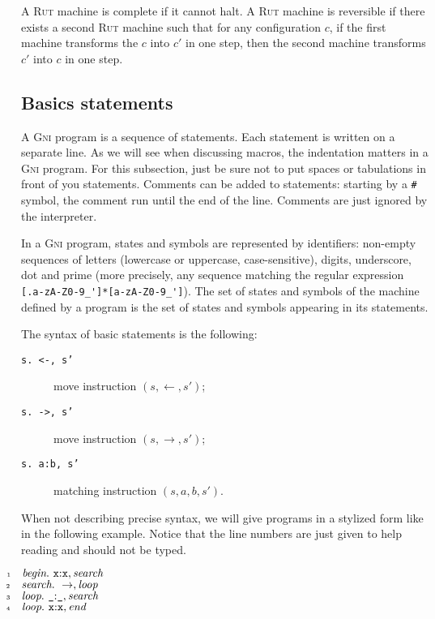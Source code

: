 \documentclass[a4paper,11pt]{article}
\theoremstyle{remark}
\begin{document}
\smallskip A \textsc{Rut} machine is complete if it cannot halt.
A \textsc{Rut} machine is reversible if there exists a second \textsc{Rut} machine such
that for any configuration $c$, if the first machine transforms the $c$ into $c'$ in one step,
then the second machine transforms $c'$ into $c$ in one step.

\subsection{Basics statements}

A \textsc{Gni} program is a sequence of statements. Each statement is written on a separate
line. As we will see when discussing macros,
the indentation matters in a \textsc{Gni} program. For this subsection, just be sure not to 
put spaces or tabulations in front of you statements. Comments can be added to statements:
starting by a \verb+#+ symbol, the comment run until the end of the line. Comments are
just ignored by the interpreter.

\smallskip In a \textsc{Gni} program, states and symbols are represented by identifiers:
non-empty sequences of letters (lowercase or uppercase, case-sensitive), digits, 
underscore, dot and prime
(more precisely, any sequence matching the regular expression \verb+[.a-zA-Z0-9_']*[a-zA-Z0-9_']+).
The set of states and symbols of the machine defined by a program is the set of states
and symbols appearing in its statements.

\medskip
\noindent The syntax of basic statements is the following:
\begin{description}
	\item[\texttt{s.~<-, s'}] move instruction $(s,\leftarrow,s')$;
	\item[\texttt{s.~->, s'}] move instruction $(s,\rightarrow,s')$;
	\item[\texttt{s.~a:b, s'}] matching instruction $(s,a,b,s')$.
\end{description}

When not describing precise syntax, we will give programs in a stylized form like in the following 
example. Notice that the line numbers are just given to help reading and should not be typed.

\begin{center}
\begin{minipage}{0.8\linewidth}
	$\null\llap{\tiny 1\kern 1.5em}\mbox{\em begin}.~\mbox{\tt x}\mbox{:}\mbox{\tt x}, \mbox{\em search}$\\
	$\null\llap{\tiny 2\kern 1.5em}\mbox{\em search}.~\rightarrow, \mbox{\em loop}$\\
	$\null\llap{\tiny 3\kern 1.5em}\mbox{\em loop}.~\mbox{\tt \_}\mbox{:}\mbox{\tt \_}, \mbox{\em search}$\\
	$\null\llap{\tiny 4\kern 1.5em}\mbox{\em loop}.~\mbox{\tt x}\mbox{:}\mbox{\tt x}, \mbox{\em end}$\\
\end{minipage}
\end{center}
\end{document}
